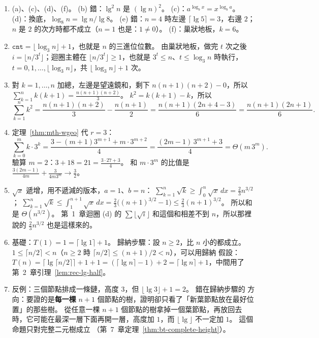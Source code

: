 \begin{enumerate}
\item (a)、(c)、(d)、(f)。 (b) 錯：$\lg^2 n$ 是 $(\lg n)^2$。 (c)：$a^{\log_b x} = x^{\log_b a}$。
(d)：換底，$\log_8 n = \lg n / \lg 8$。 (e) 錯：$n = 4$ 時左邊 $\lceil \lg 5 \rceil = 3$，右邊
$2$；$n$ 是 $2$ 的次方時都不成立（$n = 1$ 也是：$1 \ne 0$）。 (f)：巢狀地板，$k = 6$。

\item $\texttt{cnt} = \lfloor \log_3 n \rfloor + 1$，也就是 $n$ 的三進位位數。 由巢狀地板，做完
$t$ 次之後 $i = \lfloor n / 3^t \rfloor$；迴圈主體在 $\lfloor n / 3^t \rfloor \ge 1$，也就是
$3^t \le n$、$t \le \log_3 n$ 時執行，$t = 0, 1, \ldots, \lfloor \log_3 n \rfloor$，共
$\lfloor \log_3 n \rfloor + 1$ 次。

\item 對 $k = 1, \ldots, n$ 加總，左邊是望遠鏡和，剩下 $n(n+1)(n+2) - 0$，所以
$\sum_{k=1}^{n} k(k+1) = \frac{n(n+1)(n+2)}{3}$。 $k^2 = k(k+1) - k$，所以
\[
\sum_{k=1}^{n} k^2 = \frac{n(n+1)(n+2)}{3} - \frac{n(n+1)}{2} = \frac{n(n+1)(2n + 4 - 3)}{6}
= \frac{n(n+1)(2n+1)}{6}.
\]

\item 定理~\ref{thm:mth-wgeo} 代 $r = 3$：
\[
\sum_{k=0}^{m} k \cdot 3^k = \frac{3 - (m+1)3^{m+1} + m \cdot 3^{m+2}}{4}
= \frac{(2m - 1)\, 3^{m+1} + 3}{4} = \Theta(m\, 3^m).
\]
驗算 $m = 2$：$3 + 18 = 21 = \frac{3 \cdot 27 + 3}{4}$。 和 $m \cdot 3^m$ 的比值是
$\frac{3(2m-1)}{4m} + \frac{3}{4m 3^m} \to \frac32$。

\item $\sqrt{x}$ 遞增，用不遞減的版本，$a = 1$、$b = n$：
$\sum_{k=1}^{n} \sqrt k \ge \int_0^n \sqrt x\,dx = \frac23 n^{3/2}$；
$\sum_{k=1}^{n} \sqrt k \le \int_1^{n+1} \sqrt x\,dx = \frac23\bigl((n+1)^{3/2} - 1\bigr)
\le \frac23 (n+1)^{3/2}$。 所以和是 $\Theta(n^{3/2})$。 第~1~章迴圈 (d) 的 $\sum \lfloor \sqrt{i} \rfloor$ 和這個和相差不到
$n$，所以那裡說的 $\frac23 n^{3/2}$ 也是這樣來的。

\item 基礎：$T(1) = 1 = \lceil \lg 1 \rceil + 1$。 歸納步驟：設 $n \ge 2$，比 $n$ 小的都成立。
$1 \le \lceil n/2 \rceil < n$（$n \ge 2$ 時 $\lceil n/2 \rceil \le (n+1)/2 < n$），可以用歸納
假設：$T(n) = \lceil \lg \lceil n/2 \rceil \rceil + 1 + 1 = (\lceil \lg n \rceil - 1) + 2 =
\lceil \lg n \rceil + 1$，中間用了第~2~章引理~\ref{lem:rec-lg-half}。

\item 反例：三個節點排成一條鏈，高度 $3$，但 $\lfloor \lg 3 \rfloor + 1 = 2$。 錯在歸納步驟的
方向：要證的是\textbf{每一棵} $n + 1$ 個節點的樹，證明卻只看了「新葉節點放在最好位置」的那些樹。
從任意一棵 $n + 1$ 個節點的樹拿掉一個葉節點，再放回去時，它可能在最深一層下面再開一層，高度加
$1$，而 $\lfloor \lg \rfloor$ 不一定加 $1$。 這個命題只對完整二元樹成立
（第~7~章定理~\ref{thm:bt-complete-height}）。


\end{enumerate}
